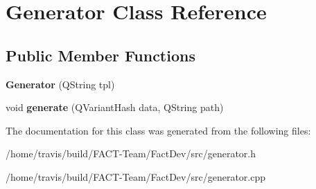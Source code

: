 \hypertarget{classGenerator}{\section{Generator Class Reference}
\label{classGenerator}
}
\subsection*{Public Member Functions}
\begin{DoxyCompactItemize}
\item 
\hypertarget{classGenerator_a1fa8cef2649c6ef99eab0ea320d1a855}{{\bfseries Generator} (Q\-String tpl)}\label{classGenerator_a1fa8cef2649c6ef99eab0ea320d1a855}

\item 
\hypertarget{classGenerator_a37ebd7de69a0535bdb7fdb6f4eda4cb5}{void {\bfseries generate} (Q\-Variant\-Hash data, Q\-String path)}\label{classGenerator_a37ebd7de69a0535bdb7fdb6f4eda4cb5}

\end{DoxyCompactItemize}


The documentation for this class was generated from the following files\-:\begin{DoxyCompactItemize}
\item 
/home/travis/build/\-F\-A\-C\-T-\/\-Team/\-Fact\-Dev/src/generator.\-h\item 
/home/travis/build/\-F\-A\-C\-T-\/\-Team/\-Fact\-Dev/src/generator.\-cpp\end{DoxyCompactItemize}

